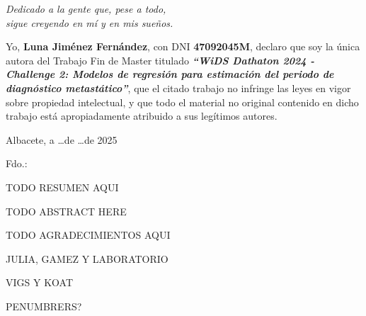 %
% 



\cleardoublepage
\thispagestyle{empty}

\vspace*{9cm}  
\begin{flushright} \em 
Dedicado a la gente que, pese a todo,\\
sigue creyendo en mí y en mis sueños.
\end{flushright}


\cleardoublepage
\thispagestyle{plain}
\setcounter{page}{1} \null
\begin{center}
\Large{}
\end{center}
\vskip1cm

Yo, \textbf{Luna Jiménez Fernández}, con DNI \textbf{47092045M}, declaro que soy la única autora del Trabajo Fin de Master titulado \textbf{\textit{``WiDS Dathaton 2024 - Challenge 2: Modelos de regresión para estimación del periodo de diagnóstico metastático''}}, que el citado trabajo no infringe las leyes en vigor sobre propiedad intelectual, y que todo el material no original contenido en dicho trabajo está apropiadamente atribuido a sus legítimos autores.

\vspace*{2cm}
\begin{center}
Albacete, a \quad \ldots \quad de \quad \ldots \quad de 2025

\vskip3cm

Fdo.: \textbf{\autor}
\end{center}


\cleardoublepage
\thispagestyle{plain}
\begin{center}
\Large{}
\end{center}
\vskip1cm

TODO RESUMEN AQUI

\cleardoublepage
\thispagestyle{plain}
\begin{center}
	\Large{}
\end{center}
\vskip1cm

TODO ABSTRACT HERE

\cleardoublepage
\thispagestyle{plain}
\begin{center}
\Large{}
\end{center}
\vskip1cm

TODO AGRADECIMIENTOS AQUI

JULIA, GAMEZ Y LABORATORIO

VIGS Y KOAT

PENUMBRERS?